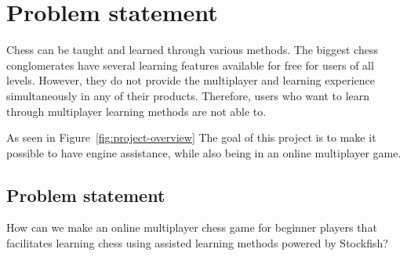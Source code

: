 \chapter{Problem statement}\label{ch:problem-statement}

Chess can be taught and learned through various methods.
The biggest chess conglomerates have several learning features available for free for users of all levels.
However, they do not provide the multiplayer and learning experience simultaneously in any of their products.
Therefore, users who want to learn through multiplayer learning methods are not able to.

As seen in Figure~\ref{fig:project-overview} The goal of this project is to make it possible to have engine
assistance, while also being in an online multiplayer game.

\section{Problem statement}\label{sec:problem-statement}

\begin{tcolorbox}
    How can we make an online multiplayer chess game for beginner players that facilitates learning chess using
    assisted learning methods powered by Stockfish?
\end{tcolorbox}
